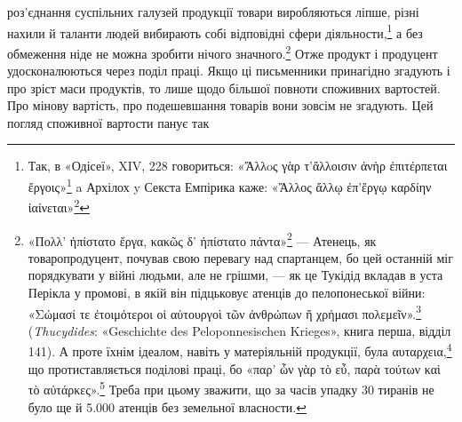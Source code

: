роз’єднання суспільних галузей продукції товари виробляються
ліпше, різні нахили й таланти людей вибирають собі відповідні
сфери діяльности,\footnote{
Так, в «Одісеї», XIV, 228 говориться: «\textgreek{Ἄλλoς γὰρ τ’ἄλλοισιν ἀνὴρ ἐπιτέρπεται ἔργοις}»\footnote*{
Одні люди люблять одне, інші — інше. \emph{Ред.}
} a Архілох y Секста Емпірика каже: «\textgreek{Ἄλλος ἄλλῳ ἐπ’ἔργῳ καρδίην ἰαίνεται}»\footnote*{
Одне тішить серце одного, інше — іншого. \emph{Ред.}
}} а без обмеження ніде не можна зробити нічого
значного.\footnote{
«\textgreek{Поλλ’ ἠπίστατο ἔργα, κακῶς δ’ ἠπίστατο πάντα}»\footnote*{
Багато знав він справ, та всі погано знав. \emph{Ред.}
} — Атенець, як товаропродуцент,
почував свою перевагу над спартанцем, бо цей останній міг
порядкувати у війні людьми, але не грішми, — як це Тукідід вкладав
в уста Перікла у промові, в якій він підцьковує атенців до пелопонеської
війни: «\textgreek{Σώμασί τε ἐτοιμότεροι οἱ αὐτουργοὶ τῶν ἀνθρώπων ἤ χρήμασι πολεμεῖν}».\footnote*{
Люди, що працюють для задоволення власних потреб, радше
віддадуть на війну свої тіла, ніж гроші. \emph{Ред.}
} (\emph{Thucydides}:
«Geschichte des Peloponnesischen Krieges», книга перша, відділ
141). А проте їхнім ідеалом, навіть у матеріяльній продукції, була
\textgreek{αυταρχεια},\footnote*{
— автаркія. \emph{Ред.}
} що протиставляється поділові праці, бо «\textgreek{παρ’ ὧν γὰρ τὸ εὖ, παρὰ τούτων καὶ τὸ
αὐτάρκες}».\footnote*{
«з цього постає благо, а з того і незалежність». \emph{Ред.}
} Треба при цьому зважити, що за часів упадку
30 тиранів не було ще й \num{5.000} атенців без земельної власности.
} Отже продукт і продуцент удосконалюються через
поділ праці. Якщо ці письменники принагідно згадують і про
зріст маси продуктів, то лише щодо більшої повноти споживних
вартостей. Про мінову вартість, про подешевшання товарів вони
зовсім не згадують. Цей погляд споживної вартости панує так

